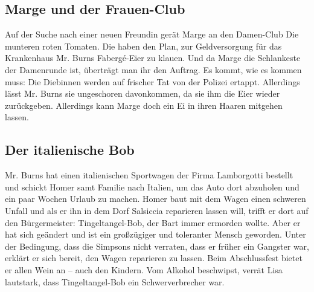 
\subsection{Marge und der Frauen-Club}\label{GABF22}
Auf der Suche nach einer neuen Freundin gerät Marge an den Damen-Club \glqq Die munteren roten Tomaten\grqq . Die haben den Plan, zur Geldversorgung für das Krankenhaus Mr. Burns Fabergé-Eier zu klauen. Und da Marge die Schlankeste der Damenrunde ist, überträgt man ihr den Auftrag. Es kommt, wie es kommen muss: Die Diebinnen werden auf frischer Tat von der Polizei ertappt. Allerdings lässt Mr. Burns sie ungeschoren davonkommen, da sie ihm die Eier wieder zurückgeben. Allerdings kann Marge doch ein Ei in ihren Haaren mitgehen lassen.


\subsection{Der italienische Bob}\label{HABF02}
Mr. Burns hat einen italienischen Sportwagen der Firma Lamborgotti bestellt und schickt Homer samt Familie nach Italien, um das Auto dort abzuholen und ein paar Wochen Urlaub zu machen. Homer baut mit dem Wagen einen schweren Unfall und als er ihn in dem Dorf Salsiccia reparieren lassen will, trifft er dort auf den Bürgermeister: Tingeltangel-Bob, der Bart immer ermorden wollte. Aber er hat sich geändert und ist ein großzügiger und toleranter Mensch geworden. Unter der Bedingung, dass die Simpsons nicht verraten, dass er früher ein Gangster war, erklärt er sich bereit, den Wagen reparieren zu lassen. Beim Abschlussfest bietet er allen Wein an -- auch den Kindern. Vom Alkohol beschwipst, verrät Lisa lautstark, dass Tingeltangel-Bob ein Schwerverbrecher war.

